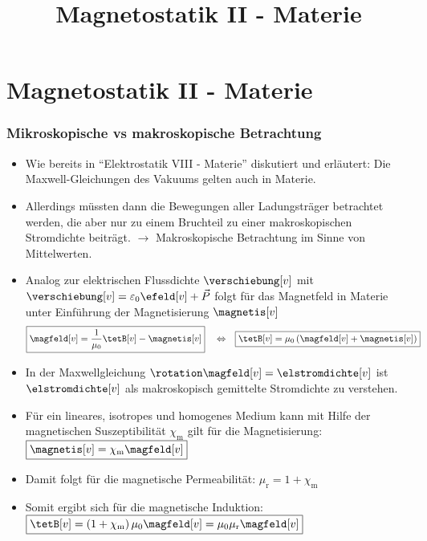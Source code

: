 

\title[TET: Magnetostatik II - Materie]{Magnetostatik II - Materie}


% 
% 

\maketitle

% 
% 
\section{Magnetostatik II - Materie}

\begin{frame}

  \frametitle{Mikroskopische vs makroskopische Betrachtung}

  \begin{itemize}[<+->]
  \item Wie bereits in \enquote{Elektrostatik VIII - Materie} diskutiert und erläutert: Die Maxwell-Gleichungen des Vakuums gelten auch in Materie.
  \item Allerdings müssten dann die \alert{Bewegungen aller Ladungsträger} betrachtet werden, die aber nur zu einem Bruchteil zu einer \alert{makroskopischen Stromdichte} beiträgt. $\to$ Makroskopische Betrachtung im Sinne von Mittelwerten.
    \item Analog zur elektrischen Flussdichte \(\verschiebung[v] \) mit
$\verschiebung[v] = \varepsilon_0 \efeld[v] + \vec{P}$
folgt für das Magnetfeld in Materie unter Einführung der \alert{Magnetisierung} \(\magnetis[v] \)
\begin{align*}
	& \boxed{\magfeld[v] = \dfrac{1}{\mu_0} \tetB[v] - \magnetis[v]}
		&& \Leftrightarrow
		&&	\boxed{\tetB[v] = \mu_0  \left( \magfeld[v] + \magnetis[v] \right)}
\end{align*}
\item In der Maxwellgleichung $\rotation \magfeld[v] = \elstromdichte[v]$
ist $\elstromdichte[v]$ als \alert{makroskopisch gemittelte Stromdichte} zu verstehen.
\item Für ein \alert{lineares, isotropes und homogenes Medium} kann mit Hilfe der \alert{magnetischen Suszeptibilität} \(\chi_\mathrm{m} \) gilt für die Magnetisierung:$\boxed{\magnetis[v] = \chi_\mathrm{m}  \magfeld[v]}$
\item Damit folgt für die magnetische Permeabilität:
$\boxed{\mu_\mathrm{r} = 1 + \chi_\mathrm{m} }$
\item Somit ergibt sich für die magnetische Induktion:
$\boxed{\tetB[v] = \left( 1 + \chi_\mathrm{m} \right) \mu_0 \magfeld[v]
		= \mu_0 \mu_\mathrm{r} \magfeld[v] }$
\end{itemize}
\end{frame}

